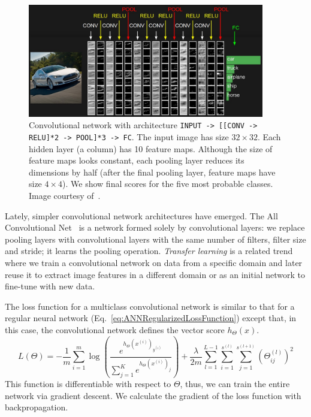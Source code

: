 \begin{figure}[h]
	\centering
	\includegraphics[width = 0.92\textwidth]{plots/convNetExample.jpeg}
	\caption[Convolutional network in action]{Convolutional network with architecture \texttt{INPUT -> [[CONV -> RELU]*2 -> POOL]*3 -> FC}. The input image has size $32\times 32$. Each hidden layer (a column) has 10 feature maps. Although the size of feature maps looks constant, each pooling layer reduces its dimensions by half (after the final pooling layer, feature maps have size $4\times 4$). We show final scores for the five most probable classes. Image courtesy of~\cite{Karpathy2016}.}
	\label{fig:ConvNetExample}
\end{figure}

Lately, simpler convolutional network architectures have emerged. The All Convolutional Net~\cite{Springenberg2014} is a network formed solely by convolutional layers: we replace pooling layers with convolutional layers with the same number of filters, filter size and stride; it learns the pooling operation.
\emph{Transfer learning} is a related trend where we train a convolutional network on data from a specific domain and later reuse it to extract image features in a different domain or as an initial network to fine-tune with new data.

The loss function for a multiclass convolutional network is similar to that for a regular neural network (Eq.~\ref{eq:ANNRegularizedLossFunction}) except that, in this case, the convolutional network defines the vector score $h_\Theta(x)$.
\begin{equation}
	L(\Theta) = -\frac{1}{m} \sum_{i=1}^m \log \left ( \frac{ e^{h_\Theta(x^{(i)})_{y^{(i)}}} }{ \sum_{j=1}^K e^{ h_\Theta (x^{(i)})_j} } \right ) + \frac{\lambda}{2m}\sum_{l=1}^{L-1}\sum_{i=1}^{s^{(l)}}\sum_{j=1}^{s^{(l+1)}} \left(\Theta^{(l)}_{ij}\right)^2
	\label{eq:ConvNetLossFunction}
\end{equation}
This function is differentiable with respect to $\Theta$, thus, we can train the entire network via gradient descent. We calculate the gradient of the loss function with backpropagation.%


